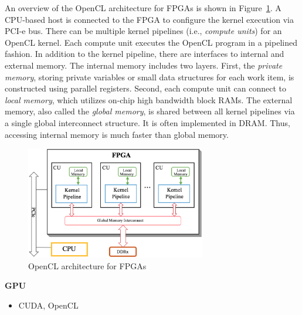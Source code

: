 \begin{itemize}
    An overview of the OpenCL architecture for FPGAs is shown in Figure~\ref{fig:opencl}. A CPU-based host is connected to the FPGA to configure the kernel execution via PCI-e bus. There can be multiple kernel pipelines (i.e., \textit{compute units}) for an OpenCL kernel. Each compute unit executes the OpenCL program in a pipelined fashion. In addition to the kernel pipeline, there are interfaces to internal and external memory. The internal memory includes two layers. First, the \textit{private memory}, storing private variables or small data structures for each work item, is constructed using parallel registers. Second, each compute unit can connect to \textit{local memory}, which utilizes on-chip high bandwidth block RAMs. The external memory, also called the \textit{global memory}, is shared between all kernel pipelines via a single global interconnect structure. It is often implemented in DRAM. Thus, accessing internal memory is much faster than global memory.

\begin{figure}[!t]
\centering
\includegraphics[width=0.70\textwidth]{figures/programingModel.eps}
\caption{OpenCL architecture for FPGAs}
\label{fig:opencl}
\end{figure}
    
    
    
\end{itemize}


\textbf{GPU}
\begin{itemize}
    \item CUDA, OpenCL
\end{itemize}



\clearpage

